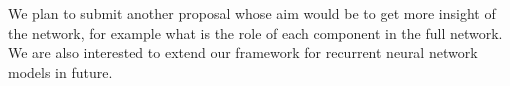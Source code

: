 We plan to submit another proposal whose aim would be to get more insight of the network, for example what is the role of each component in the full network. We are also interested to extend our framework for recurrent neural network models in future. 






